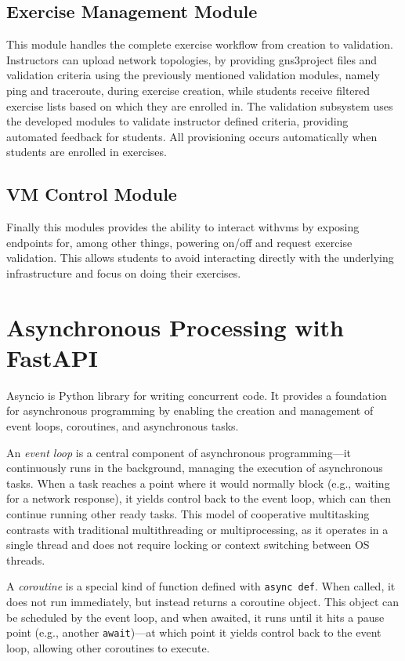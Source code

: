     \subsection{Exercise Management Module}
        This module handles the complete exercise workflow from creation to validation. Instructors can upload 
        network topologies, by providing gns3project files and validation criteria using the previously mentioned 
        validation modules, namely ping and traceroute, during exercise creation, while students receive filtered 
        exercise lists based on which they are enrolled in. The validation subsystem uses the developed modules 
        to validate instructor defined criteria, providing automated feedback for students. All provisioning 
        occurs automatically when students are enrolled in exercises.

    \subsection{VM Control Module}
        Finally this modules provides the ability to interact with\ac{vm}s by exposing endpoints for, among other 
        things, powering on/off and request exercise validation. This allows students to avoid interacting directly with 
        the underlying infrastructure and focus on doing their exercises.

\section{Asynchronous Processing with FastAPI}
    Asyncio is Python library for writing concurrent code. It provides a foundation for asynchronous programming by enabling 
    the creation and management of event loops, coroutines, and asynchronous tasks.

    An \textit{event loop} is a central component of asynchronous programming—it continuously runs in the background, managing 
    the execution of asynchronous tasks. When a task reaches a point where it would normally block (e.g., waiting for a network 
    response), it yields control back to the event loop, which can then continue running other ready tasks. This model of 
    cooperative multitasking contrasts with traditional multithreading or multiprocessing, as it operates in a single thread 
    and does not require locking or context switching between OS threads.

    A \textit{coroutine} is a special kind of function defined with \texttt{async def}. When called, it does not run immediately, 
    but instead returns a coroutine object. This object can be scheduled by the event loop, and when awaited, it runs until it 
    hits a pause point (e.g., another \texttt{await})—at which point it yields control back to the event loop, allowing other 
    coroutines to execute.

